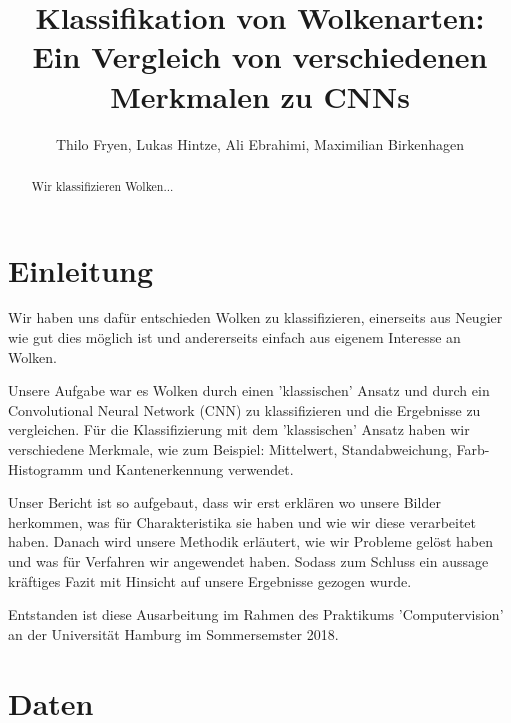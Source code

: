 \documentclass[a4,german]{article}
\begin{document}
\title{Klassifikation von Wolkenarten: Ein Vergleich von verschiedenen Merkmalen zu CNNs} %
\author{Thilo Fryen, Lukas Hintze, Ali Ebrahimi, Maximilian Birkenhagen} %
\maketitle %


\begin{abstract}
    Wir klassifizieren Wolken...
\end{abstract}

\newpage
\section{Einleitung}


Wir haben uns dafür entschieden Wolken zu klassifizieren, einerseits aus Neugier wie gut dies möglich ist und andererseits einfach aus eigenem Interesse an Wolken.

Unsere Aufgabe war es Wolken durch einen 'klassischen' Ansatz und durch ein Convolutional Neural Network (CNN) zu klassifizieren und die Ergebnisse zu vergleichen. 
Für die Klassifizierung mit dem 'klassischen' Ansatz haben wir verschiedene Merkmale, wie zum Beispiel: Mittelwert, Standabweichung, Farb-Histogramm und Kantenerkennung verwendet.
 
 Unser Bericht ist so aufgebaut, dass wir erst erklären wo unsere Bilder herkommen, was für Charakteristika sie haben und wie wir diese verarbeitet haben. Danach wird unsere Methodik erläutert, wie wir Probleme gelöst haben und was für Verfahren wir angewendet haben. Sodass zum Schluss ein aussage kräftiges Fazit mit Hinsicht auf unsere Ergebnisse gezogen wurde.
 
Entstanden ist diese Ausarbeitung im Rahmen des Praktikums 'Computervision' an der Universität Hamburg im Sommersemster 2018.



\section{Daten}
\end{document}
